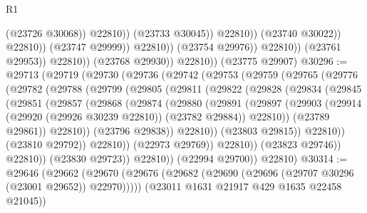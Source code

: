 \begin{lexlean}{R1}
\begin{coremodule}
                                              (@23726 @30068))
                                            @22810))
                                        (@23733 @30045))
                                      @22810))
                                  (@23740 @30022))
                                @22810))
                            (@23747 @29999))
                          @22810))
                      (@23754 @29976))
                    @22810))
                (@23761 @29953))
              @22810))
          (@23768 @29930))
        @22810))
    (@23775 @29907)
@30296 := @29713
    (@29719
      (@29730
        (@29736
          (@29742
            (@29753
              (@29759
                (@29765
                  (@29776
                    (@29782
                      (@29788
                        (@29799
                          (@29805
                            (@29811
                              (@29822
                                (@29828
                                  (@29834
                                    (@29845
                                      (@29851
                                        (@29857
                                          (@29868
                                            (@29874
                                              (@29880
                                                (@29891
                                                  (@29897
                                                    (@29903
                                                      (@29914
                                                        (@29920 (@29926 @30239 @22810))
                                                        (@23782 @29884))
                                                      @22810))
                                                  (@23789 @29861))
                                                @22810))
                                            (@23796 @29838))
                                          @22810))
                                      (@23803 @29815))
                                    @22810))
                                (@23810 @29792))
                              @22810))
                          (@22973 @29769))
                        @22810))
                    (@23823 @29746))
                  @22810))
              (@23830 @29723))
            @22810))
        (@22994 @29700))
      @22810)
@30314 := @29646
    (@29662
      (@29670 (@29676 (@29682 (@29690 (@29696 (@29707 @30296 (@23001 @29652)) @22970)))))
      (@23011 @1631 @21917 @429 @1635 @22458 @21045))

\end{coremodule}
\end{lexlean}
